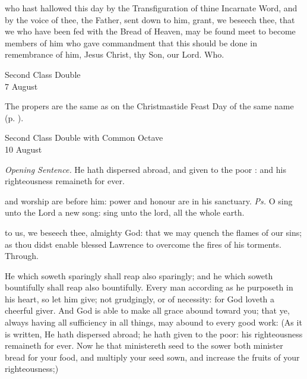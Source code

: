 
\postcommunion
{} who hast hallowed this day by the Transfiguration of thine Incarnate Word, and by the voice of thee, the Father, sent down to him, grant, we beseech thee, that we who have been fed with the Bread of Heaven, may be found meet to become members of him who gave commandment that this should be done in remembrance of him, Jesus Christ, thy Son, our Lord. Who.

\begin{inhead}
    {Second Class Double\\
7 August}
\end{inhead}
\begin{rubric}
    The propers are the same as on the Christmastide Feast Day of the same name (p. \pageref{MostHolyName}).
\end{rubric}

\begin{inhead}
    {Second Class Double with Common Octave\\
10 August}
\end{inhead}
\par\noindent
\textit{Opening Sentence.} He hath dispersed abroad, and given to the poor : and his righteousness remaineth for ever.%

\introit
{} and worship are before him: power and honour are in his sanctuary. \textit{Ps.} O sing unto the Lord a new song: sing unto the lord, all the whole earth.

\collect
{} to us, we beseech thee, almighty God: that we may quench the flames of our sins; as thou didst enable blessed Lawrence to overcome the fires of his torments. Through.

 He which soweth sparingly shall reap also sparingly; and he which soweth bountifully shall reap also bountifully. Every man according as he purposeth in his heart, so let him give; not grudgingly, or of necessity: for God loveth a cheerful giver. And God is able to make all grace abound toward you; that ye, always having all sufficiency in all things, may abound to every good work: (As it is written, He hath dispersed abroad; he hath given to the poor: his righteousness remaineth for ever. Now he that ministereth seed to the sower both minister bread for your food, and multiply your seed sown, and increase the fruits of your righteousness;)


